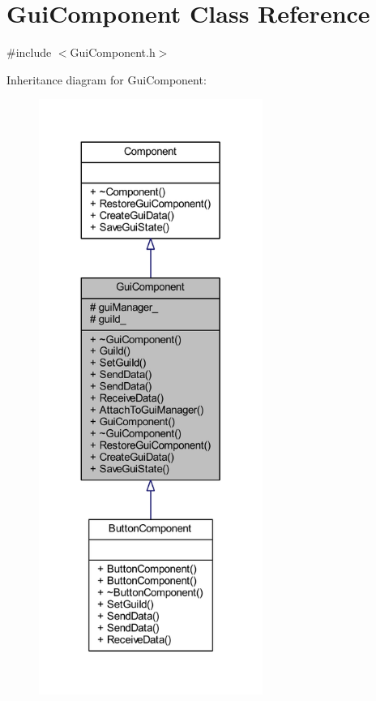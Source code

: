 \hypertarget{class_gui_component}{}\section{Gui\+Component Class Reference}
\label{class_gui_component}


{\ttfamily \#include $<$Gui\+Component.\+h$>$}



Inheritance diagram for Gui\+Component\+:
\nopagebreak
\begin{figure}[H]
\begin{center}
\leavevmode
\includegraphics[height=550pt]{class_gui_component__inherit__graph}
\end{center}
\end{figure}


